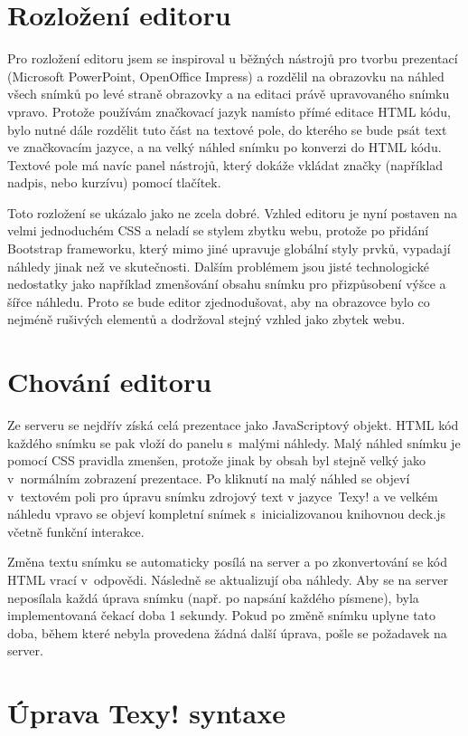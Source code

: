 \documentclass[11pt,twoside,a4paper]{book}
\begin{document}
\section{Rozložení editoru}
Pro rozložení editoru jsem se inspiroval u běžných nástrojů pro tvorbu prezentací (Microsoft PowerPoint, OpenOffice
Impress) a rozdělil na obrazovku na náhled všech snímků po levé straně obrazovky a na editaci právě upravovaného snímku
vpravo. Protože používám značkovací jazyk namísto přímé editace HTML kódu, bylo nutné dále rozdělit tuto část na
textové pole, do kterého se bude psát text ve značkovacím jazyce, a na velký náhled snímku po konverzi do HTML kódu.
Textové pole má navíc panel nástrojů, který dokáže vkládat značky (například nadpis, nebo kurzívu) pomocí tlačítek.

Toto rozložení se ukázalo jako ne zcela dobré. Vzhled editoru je nyní postaven na velmi jednoduchém CSS a neladí se
stylem zbytku webu, protože po přidání Bootstrap frameworku, který mimo jiné upravuje globální styly prvků, vypadají
náhledy jinak než ve skutečnosti. Dalším problémem jsou jisté technologické nedostatky jako například zmenšování obsahu
snímku pro přizpůsobení výšce a šířce náhledu. Proto se bude editor zjednodušovat, aby na obrazovce bylo co nejméně
rušivých elementů a dodržoval stejný vzhled jako zbytek webu.


\section[Chování editoru]{Chování editoru}
Ze serveru se nejdřív získá celá prezentace jako JavaScriptový objekt. HTML kód každého snímku se pak vloží do panelu
s~malými náhledy. Malý náhled snímku je pomocí CSS pravidla zmenšen, protože jinak by obsah byl stejně velký jako
v~normálním zobrazení prezentace. Po kliknutí na malý náhled se objeví v~textovém poli pro úpravu snímku zdrojový text
v jazyce~Texy! a ve velkém náhledu vpravo se objeví kompletní snímek s~inicializovanou knihovnou deck.js včetně funkční
interakce.

Změna textu snímku se automaticky posílá na server a po zkonvertování se kód HTML vrací v~odpovědi. Následně se
aktualizují oba náhledy. Aby se na server neposílala každá úprava snímku (např. po napsání každého písmene), byla
implementovaná čekací doba 1 sekundy. Pokud po změně snímku uplyne tato doba, během které nebyla provedena žádná další
úprava, pošle se požadavek na server.


\section{Úprava Texy! syntaxe}
\end{document}
